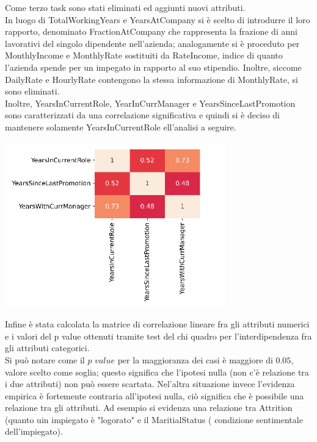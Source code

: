 \documentclass[english]{article}
\begin{document}
Come terzo task sono stati eliminati ed aggiunti nuovi attributi.\\
In luogo di TotalWorkingYears e YearsAtCompany si è scelto di introdurre il loro rapporto, denominato FractionAtCompany che rappresenta la frazione di anni lavorativi del singolo dipendente nell'azienda; analogamente si è proceduto per MonthlyIncome e MonthlyRate sostituiti da RateIncome, indice di quanto l'azienda spende per un impegato in rapporto al suo stipendio. Inoltre, siccome DailyRate e HourlyRate contengono la stessa informazione di MonthlyRate, si sono eliminati.\\
Inoltre, YearsInCurrentRole, YearInCurrManager e YearsSinceLastPromotion sono caratterizzati da una correlazione significativa e quindi si è deciso di mantenere solamente YearsInCurrentRole ell'analisi a seguire.
\begin{center}
\includegraphics[scale=0.7]{years.png}
\end{center}
Infine è stata calcolata la matrice di correlazione lineare fra gli attributi numerici e i valori del p value ottenuti tramite test del chi quadro per l'interdipendenza fra gli attributi categorici.\\

Si può notare come il $p$ $value$ per la maggioranza dei casi è maggiore di $0.05$, valore scelto come soglia; questo significa che l'ipotesi nulla (non c'è relazione tra i due attributi) non può essere scartata. Nel'altra situazione invece l'evidenza empirica è fortemente contraria all'ipotesi nulla, ciò significa che è possibile una relazione tra gli attributi. Ad esempio si evidenza una relazione tra Attrition (quanto uin impiegato è "logorato" e il MaritialStatus ( condizione sentimentale dell'impiegato).\\
\end{document}
